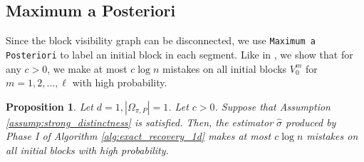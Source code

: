 \documentclass{article}
\newcommand{\1}{\mathbbm{1}}
\theoremstyle{definition}
\theoremstyle{plain}
\newtheorem{prop}{Proposition}
\begin{document}
\subsection{Maximum a Posteriori}
Since the block visibility graph can be disconnected, we use \texttt{Maximum a Posteriori} to label an initial block in each segment. Like in \cite{Gaudio+2025}, we show that for any $c > 0$, we make at most $c \log n$ mistakes on all initial blocks $V_0^m$ for $m = 1, 2, \ldots, \ell$ with high probability. 
\begin{prop}
\label{prop:MAP_1d}
        Let $d = 1, |\Omega_{\pi, P}| = 1$. Let $c > 0$. Suppose that Assumption \ref{assump:strong_distinctness} is satisfied. Then, the estimator $\hat{\sigma}$ produced by Phase I of Algorithm \ref{alg:exact_recovery_1d} makes at most $c \log n$ mistakes on all initial blocks with high probability.
    \end{prop}
\end{document}
